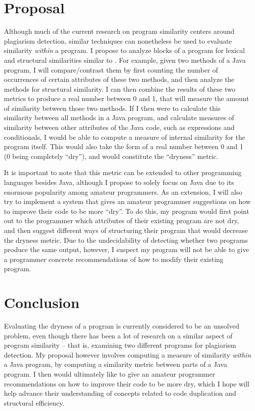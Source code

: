 \documentclass{article}
\begin{document}
\section{Proposal} Although much of the current research on program similarity centers around plagiarism detection, similar techniques can nonetheless be used to evaluate similarity \textit{within} a program. I propose to analyze blocks of a program for lexical and structural similarities similar to \cite{ProgramSimilarityPopulations}. For example, given two methods of a Java program, I will compare/contrast them by first counting the number of occurrences of certain attributes of these two methods, and then analyze the methods for structural similarity. I can then combine the results of these two metrics to produce a real number between 0 and 1, that will measure the amount of similarity between those two methods. If I then were to calculate this similarity between all methods in a Java program, and calculate measures of similarity between other attributes of the Java code, such as expressions and conditionals, I would be able to compute a measure of internal similarity for the program itself. This would also take the form of a real number between 0 and 1 (0 being completely ``dry''), and would constitute the ``dryness'' metric.

It is important to note that this metric can be extended to other programming languages besides Java, although I propose to solely focus on Java due to its enormous popularity among amateur programmers. As an extension, I will also try to implement a system that gives an amateur programmer suggestions on how to improve their code to be more ``dry''. To do this, my program would first point out to the programmer which attributes of their existing program are not dry, and then suggest different ways of structuring their program that would decrease the dryness metric. Due to the undecidability of detecting whether two programs produce the same output, however, I suspect my program will not be able to give a programmer concrete recommendations of how to modify their existing program.

\section{Conclusion} Evaluating the dryness of a program is currently considered to be an unsolved problem, even though there has been a lot of research on a similar aspect of program similarity -- that is, examining two different programs for plagiarism detection. My proposal however involves computing a measure of similarity \textit{within} a Java program, by computing a similarity metric between parts of a Java program. I then would ultimately like to give an amateur programmer recommendations on how to improve their code to be more dry, which I hope will help advance their understanding of concepts related to code duplication and structural efficiency.


\pagebreak
\pagestyle{empty}



\end{document}
